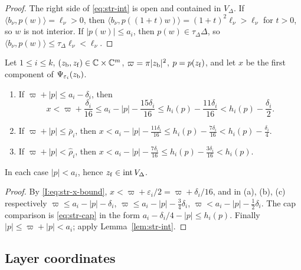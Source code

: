 \begin{proof}
The right side of \eqref{eq:str-int} is open and contained in $V_\Delta$. If $\langle b_\nu,p(w)\rangle=\ell_\nu>0$, then $\langle b_\nu,p((1+t)w)\rangle=(1+t)^2\ell_\nu>\ell_\nu$ for $t>0$, so $w$ is not interior. If $|p(w)|\le a_i$, then $p(w)\in\tau_\Delta\Delta$, so $\langle b_\nu,p(w)\rangle\le\tau_\Delta\ell_\nu<\ell_\nu$.
\end{proof}



\begin{lemma}\label{lem:str-ball}
Let $1\le i\le k$, $(z_{\rm b},z_{\rm f})\in\mathbb{C}\times\mathbb{C}^m$, $\varpi=\pi|z_{\rm b}|^2$, $p=p(z_{\rm f})$, and let $x$ be the first
component of $\Psi_{\varepsilon_i}(z_{\rm b})$.
\begin{enumerate}[label=(\alph*)]
\item If $\varpi+|p|\le a_i-\delta_i$, then
\begin{equation}\label{eq:str-ball}
 x<\varpi+\frac{\delta_i}{16}\le a_i-|p|-\frac{15\delta_i}{16}
 \le h_i(p)-\frac{11\delta_i}{16}<h_i(p)-\frac{\delta_i}2 .
\end{equation}
\item If $\varpi+|p|\le\bar\rho_i$, then $x<a_i-|p|-\frac{11\delta_i}{16}\le h_i(p)-\frac{7\delta_i}{16}<h_i(p)-\frac{\delta_i}4$.
\item If $\varpi+|p|<\hat\rho_i$, then $x<a_i-|p|-\frac{7\delta_i}{16}\le h_i(p)-\frac{3\delta_i}{16}<h_i(p)$.
\end{enumerate}
In each case $|p|<a_i$, hence $z_{\rm f}\in\operatorname{int}V_\Delta$.
\end{lemma}

\begin{proof}
By \eqref{I:eq:str-x-bound}, $x<\varpi+\varepsilon_i/2=\varpi+\delta_i/16$, and in (a), (b), (c) respectively $\varpi\le a_i-|p|-\delta_i$, $\varpi\le a_i-|p|-\frac34\delta_i$, $\varpi<a_i-|p|-\frac12\delta_i$. The cap comparison is \eqref{eq:str-cap} in the form $a_i-\delta_i/4-|p|\le h_i(p)$. Finally $|p|\le\varpi+|p|<a_i$; apply Lemma~\ref{lem:str-int}.
\end{proof}

\subsection{Layer coordinates}\label{sec:str-layer-coords}

